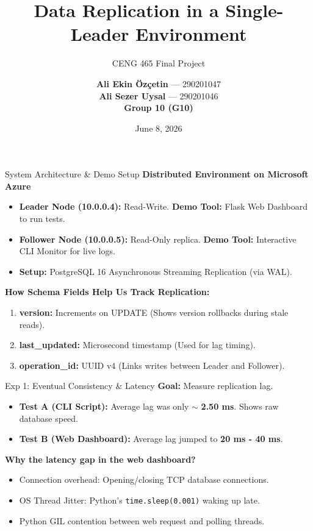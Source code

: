 \documentclass[aspectratio=169]{beamer}
\title[CENG 465 - Data Replication]{Data Replication in a Single-Leader Environment}
\subtitle{CENG 465 Final Project}
\author[Özçetin \& Uysal]{
    \textbf{Ali Ekin Özçetin} — 290201047 \\
    \textbf{Ali Sezer Uysal} — 290201046 \\[5pt]
    \textbf{Group 10 (G10)}
}
\institute[IZTECH]{Izmir Institute of Technology \\ Computer Engineering Department}
\date{June 8, 2026}
\begin{document}
\begin{frame}
    \titlepage
\end{frame}

\begin{frame}{System Architecture \& Demo Setup}
    \textbf{Distributed Environment on Microsoft Azure}
    \begin{itemize}
        \item \textbf{Leader Node (10.0.0.4):} Read-Write. \textbf{Demo Tool:} Flask Web Dashboard to run tests.
        \item \textbf{Follower Node (10.0.0.5):} Read-Only replica. \textbf{Demo Tool:} Interactive CLI Monitor for live logs.
        \item \textbf{Setup:} PostgreSQL 16 Asynchronous Streaming Replication (via WAL).
    \end{itemize}
    \vspace{0.3cm}
    \textbf{How Schema Fields Help Us Track Replication:}
    \begin{enumerate}
        \item \textbf{version:} Increments on UPDATE (Shows version rollbacks during stale reads).
        \item \textbf{last\_updated:} Microsecond timestamp (Used for lag timing).
        \item \textbf{operation\_id:} UUID v4 (Links writes between Leader and Follower).
    \end{enumerate}
\end{frame}

\begin{frame}{Exp 1: Eventual Consistency \& Latency}
    \textbf{Goal:} Measure replication lag.
    \begin{itemize}
        \item \textbf{Test A (CLI Script):} Average lag was only $\sim$ \textbf{2.50 ms}. Shows raw database speed.
        \item \textbf{Test B (Web Dashboard):} Average lag jumped to \textbf{20 ms - 40 ms}.
    \end{itemize}
    \vspace{0.2cm}
    \textbf{Why the latency gap in the web dashboard?} 
    \begin{itemize}
        \item Connection overhead: Opening/closing TCP database connections.
        \item OS Thread Jitter: Python's \texttt{time.sleep(0.001)} waking up late.
        \item Python GIL contention between web request and polling threads.
    \end{itemize}
\end{frame}
\end{document}
